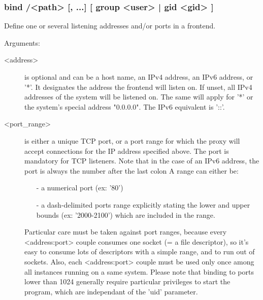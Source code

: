 \subsubsection*{bind /<path> [, ...] [ group <user> | gid <gid> ]}

  Define one or several listening addresses and/or ports in a frontend.
    
                                
  Arguments:
  \begin{description}
  \item[<address>]     is optional and can be a host name, an IPv4 address, an IPv6
                  address, or '*'. It designates the address the frontend will
                  listen on. If unset, all IPv4 addresses of the system will be
                  listened on. The same will apply for '*' or the system's
                  special address "0.0.0.0". The IPv6 equivalent is '::'.

  \item[<port\_range>]  is either a unique TCP port, or a port range for which the
                  proxy will accept connections for the IP address specified
                  above. The port is mandatory for TCP listeners. Note that in
                  the case of an IPv6 address, the port is always the number
                  after the last colon \chr{:} A range can either be:
                  
                  \begin{itemize}
                  \item[-] a numerical port (ex: '80')
                  \item[-] a dash-delimited ports range explicitly stating the lower
                     and upper bounds (ex: '2000-2100') which are included in
                     the range.
                  \end{itemize}

                  Particular care must be taken against port ranges, because
                  every <address:port> couple consumes one socket (= a file
                  descriptor), so it's easy to consume lots of descriptors
                  with a simple range, and to run out of sockets. Also, each
                  <address:port> couple must be used only once among all
                  instances running on a same system. Please note that binding
                  to ports lower than 1024 generally require particular
                  privileges to start the program, which are independant of
                  the 'uid' parameter.


\end{description}
